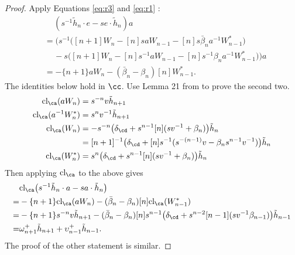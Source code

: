 \begin{proof}
Apply Equations \eqref{eq:r3} and \eqref{eq:r1} :
\begin{align*}
& \quad \, ( s^{-1} \tilde{h}_n \cdot e - s e \cdot \tilde{h}_n ) a \\
&=  \Big( s^{-1} \big( [n+1] W_n - [n] s a W_{n-1} - [n] s \bar{\beta}_n a^{-1} W^*_{n-1} \big) \\
&\quad \, - s \big( [n+1] W_n - [n] s^{-1} a W_{n-1} - [n] s^{-1} \beta_n a^{-1} W^*_{n-1} \big) \Big) a \\
&= - \{n+1\} a W_n - ( \bar{\beta}_n - \beta_n ) [n] W^*_{n-1}.
\end{align*}
The identities below hold in $\cc$. Use Lemma 21 from \cite{She16} to prove the second two.
\begin{align*}
\textrm{cl}_\ca ( a W_n ) &= s^{-n} v \tilde{h}_{n+1} \\
\textrm{cl}_\ca ( a^{-1} W^*_n ) &= s^n v^{-1} \tilde{h}_{n+1} \\
\textrm{cl}_\ca ( W_n ) &= -s^{-n} \big( \delta_\cd + s^{n-1} [n] ( s v^{-1} + \beta_n ) \big) \tilde{h}_n \\
&= [n+1]^{-1} \big( \delta_\cd + [n]s^{-1} ( s^{-(n-1)} v - \beta_n s^{n-1} v^{-1} ) \big) \tilde{h}_n \\
\textrm{cl}_\ca ( W^*_n ) &= s^n \big( \delta_\cd + s^{n-1} [n] ( s v^{-1} + \beta_n ) \big) \tilde{h}_n
\end{align*}
Then applying $\textrm{cl}_\ca$ to the above gives
\begin{align*} 
& \textrm{cl}_\ca \big( s^{-1} \tilde{h}_n \cdot a - s a \cdot \tilde{h}_n \big) \\
=& - \{n+1\} \textrm{cl}_\ca ( a W_n ) - ( \bar{\beta}_n - \beta_n ) [n] \textrm{cl}_\ca ( W^*_{n-1} ) \\
= & - \{n+1\} s^{-n} v \tilde{h}_{n+1} - ( \bar{\beta}_n - \beta_n ) [n] s^{n-1} \big( \delta_\cd + s^{n-2} [n-1] ( s v^{-1} \beta_{n-1} ) \big) \tilde{h}_{n-1} \\
= & \omega_{n+1}^+ \tilde{h}_{n+1} + \upsilon_{n-1}^+ \tilde{h}_{n-1}.
\end{align*}
The proof of the other statement is similar. 
\end{proof}

